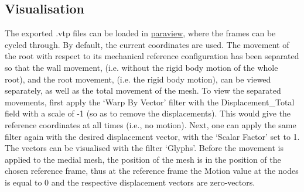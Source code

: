 \documentclass{article}
\begin{document}
\subsection*{Visualisation}
The exported .vtp files can be loaded in \href{https://www.paraview.org}{paraview}, where the frames can be cycled through. By default, the current coordinates are used. The movement of the root with respect to its mechanical reference configuration has been separated so that the wall movement, (i.e. without the rigid body motion of the whole root), and the root movement, (i.e. the rigid body motion), can be viewed separately, as well as the total movement of the mesh. To view the separated movements, first apply the `Warp By Vector' filter with the Displacement\_Total field with a scale of -1 (so as to remove the displacements). This would give the reference coordinates at all times (i.e., no motion). Next, one can apply the same filter again with the desired displacement vector, with the `Scalar Factor' set to 1. The vectors can be visualised with the filter `Glyphs'. Before the movement is applied to the medial mesh, the position of the mesh is in the position of the chosen reference frame, thus at the reference frame the Motion value at the nodes is equal to 0 and the respective displacement vectors are zero-vectors.

\end{document}
